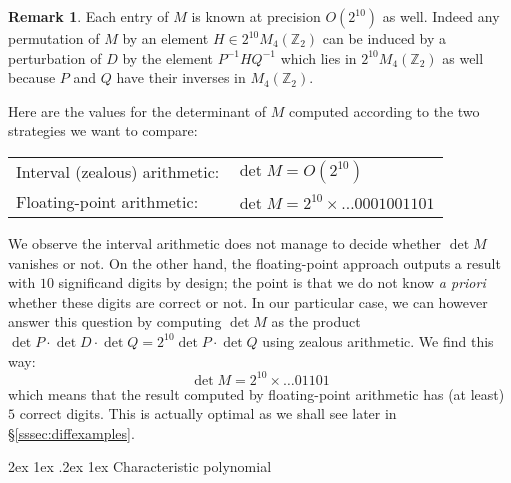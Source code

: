\documentclass[11pt]{article}
\makeatletter
\numberwithin{equation}{section}
\numberwithin{figure}{section}
\renewcommand\paragraph{\@startsection{paragraph}{4}{\z@}%
                                    {2ex \@plus1ex \@minus.2ex}%
                                    {1ex}%
                                    {\normalfont\normalsize\bfseries}}
\theoremstyle{definition}
\newtheorem{rem}[theo]{Remark}
\newcommand{\Z}{\mathbb Z}
\makeatother
\begin{document}
\begin{rem}
Each entry of $M$ is known at precision $O(2^{10})$ as well. Indeed any 
permutation of $M$ by an element $H \in 2^{10} M_4(\Z_2)$ can be induced 
by a perturbation of $D$ by the element $P^{-1} H Q^{-1}$ which lies in 
$2^{10} M_4(\Z_2)$ as well because $P$ and $Q$ have their inverses in 
$M_4(\Z_2)$.
\end{rem}

Here are the values for the determinant of $M$ computed according to
the two strategies we want to compare:
\begin{center}
\begin{tabular}{ll}
Interval (zealous) arithmetic: & $\det M = O(2^{10})$ \smallskip \\
Floating-point arithmetic: & $\det M = 2^{10} \times \ldots0001001101$
\end{tabular}
\end{center}
We observe the interval arithmetic does not manage to decide whether
$\det M$ vanishes or not. On the other hand, the floating-point approach
outputs a result with $10$ significand digits by design; the point is
that we do not know \emph{a priori} whether these digits are correct or not.
In our particular case, we can however answer this question by computing 
$\det M$ as the product $\det P \cdot \det D \cdot \det Q = 2^{10} 
\det P \cdot \det Q$ using zealous arithmetic. We find this way:
$$\det M = 2^{10} \times \ldots 01101$$
which means that the result computed by floating-point arithmetic has (at
least) $5$ correct digits. This is actually optimal as we shall see
later in \S \ref{sssec:diffexamples}.

\paragraph{Characteristic polynomial}
\end{document}
